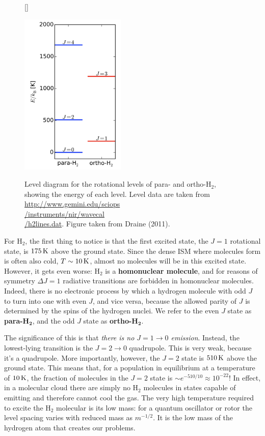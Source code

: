 \documentclass[a4paper,10pt]{article}
\begin{document}
\begin{figure}[h]
    [\FBwidth]
    {\caption{\footnotesize{Level diagram for the rotational levels of para- and ortho-H$_2$, showing the energy of each level. Level data are taken from \href{http://www.gemini.edu/sciops/instruments/nir/wavecal/h2lines.dat}{http://www.gemini.edu/sciops\\/instruments/nir/wavecal\\/h2lines.dat}. Figure taken from Draine (2011).}}
    \label{fig:Henergies}}
    {\includegraphics[width=5cm]{figures/Henergies.png}}
\end{figure}

{\noindent}For H$_2$, the first thing to notice is that the first excited state, the $J=1$ rotational state, is $175\,{\rm K}$ above the ground state. Since the dense ISM where molecules form is often also cold, $T\sim10\,{\rm K}$, almost no molecules will be in this excited state. However, it gets even worse: H$_2$ is a \textbf{homonuclear molecule}, and for reasons of symmetry $\Delta J=1$ radiative transitions are forbidden in homonuclear molecules. Indeed, there is no electronic process by which a hydrogen molecule with odd $J$ to turn into one with even $J$, and vice versa, because the allowed parity of $J$ is determined by the spins of the hydrogen nuclei. We refer to the even $J$ state as \textbf{para-H}$\mathbf{_2}$, and the odd $J$ state as \textbf{ortho-H}$\mathbf{_2}$.

{\noindent}The significance of this is that \textit{there is no $J=1\rightarrow0$ emission}. Instead, the lowest-lying transition is the $J=2\rightarrow0$ quadrupole. This is very weak, because it's a quadrupole. More importantly, however, the $J=2$ state is $510\,{\rm K}$ above the ground state. This means that, for a population in equilibrium at a temperature of $10\,{\rm K}$, the fraction of molecules in the $J=2$ state is $\sim e^{-510/10}\approx10^{-22}$! In effect, in a molecular cloud there are simply no H$_2$ molecules in states capable of emitting and therefore cannot cool the gas. The very high temperature required to excite the H$_2$ molecular is its low mass: for a quantum oscillator or rotor the level spacing varies with reduced mass as $m^{-1/2}$. It is the low mass of the hydrogen atom that creates our problems.
\end{document}
